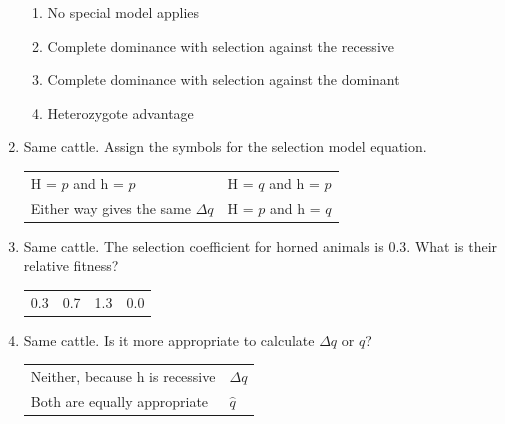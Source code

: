 \documentclass[11pt]{article}
\newcommand{\work}[1]{\par\vspace{#1}}
\begin{document}
\begin{enumerate}[label=\textbf{\arabic*.}, leftmargin=2em, itemsep=1.4em]
\begin{enumerate}[label={}, leftmargin=2.4em, labelwidth=0pt, itemsep=2pt, topsep=0pt]
\item \hspace*{-2.4em}No special model applies
\item \hspace*{-2.4em}Complete dominance with selection against the recessive
\item \hspace*{-2.4em}Complete dominance with selection against the dominant
\item \hspace*{-2.4em}Heterozygote advantage
\end{enumerate}
\item Same cattle. Assign the symbols for the selection model equation.
\par\smallskip\noindent\begin{tabularx}{\linewidth}{@{}YY@{}}
H = \(p\) and h = \(p\) & H = \(q\) and h = \(p\) \\[3pt]
Either way gives the same \(\Delta q\) & H = \(p\) and h = \(q\) \\
\end{tabularx}
\item Same cattle. The selection coefficient for horned animals is 0.3. What is their relative fitness?
\par\smallskip\noindent\begin{tabularx}{\linewidth}{@{}YYYY@{}}
0.3 & 0.7 & 1.3 & 0.0 \\
\end{tabularx}
\work{1.6cm}
\item Same cattle. Is it more appropriate to calculate \(\Delta q\) or \(\hat{q}\)?
\par\smallskip\noindent\begin{tabularx}{\linewidth}{@{}YY@{}}
Neither, because h is recessive & \(\Delta q\) \\[3pt]
Both are equally appropriate & \(\hat{q}\) \\
\end{tabularx}

\end{enumerate}
\end{document}
